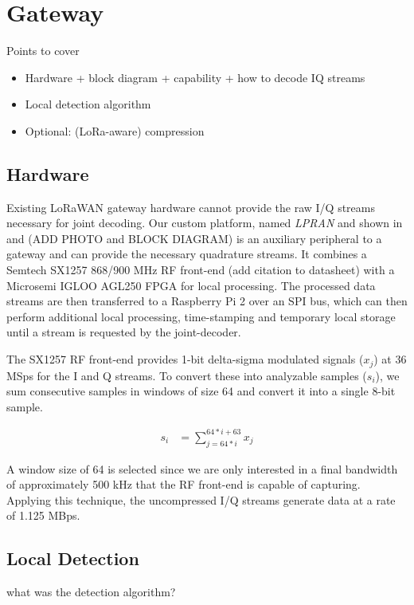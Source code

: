 \section{Gateway}
\label{sec:gateway}

{\color{blue} Points to cover
\begin{itemize}
    \item Hardware + block diagram + capability + how to decode IQ streams
    \item Local detection algorithm
    \item Optional: (LoRa-aware) compression
\end{itemize}

}

\subsection{Hardware}
\label{sec:hardware}

Existing LoRaWAN gateway hardware cannot provide the raw I/Q streams necessary
for joint decoding. Our custom platform, named \textit{LPRAN} and shown in
 and  {\color{blue} (ADD PHOTO and
BLOCK DIAGRAM)} is an auxiliary peripheral to a gateway and can provide the
necessary quadrature streams. It combines a Semtech SX1257 868/900 MHz RF
front-end {\color{blue} (add citation to datasheet)} with a Microsemi IGLOO
AGL250 FPGA for local processing. The processed data streams are then
transferred to a Raspberry Pi 2 over an SPI bus, which can then perform
additional local processing, time-stamping and temporary local storage until a
stream is requested by the joint-decoder.

The SX1257 RF front-end provides 1-bit delta-sigma modulated signals ($x_j$)
at 36 MSps for the I and Q streams. To convert these into analyzable samples
($s_i$), we sum consecutive samples in windows of size 64 and convert it into
a single 8-bit sample.

\begin{align*}
s_i &= \sum_{j=64*i}^{64*i + 63} x_j
\end{align*}

A window size of 64 is selected since we are only interested in a final
bandwidth of approximately 500 kHz that the RF front-end is capable of
capturing. Applying this technique, the uncompressed I/Q streams generate data
at a rate of 1.125 MBps.

\subsection{Local Detection}
\label{sec:local-detection}

{\color{blue}

what was the detection algorithm?

}